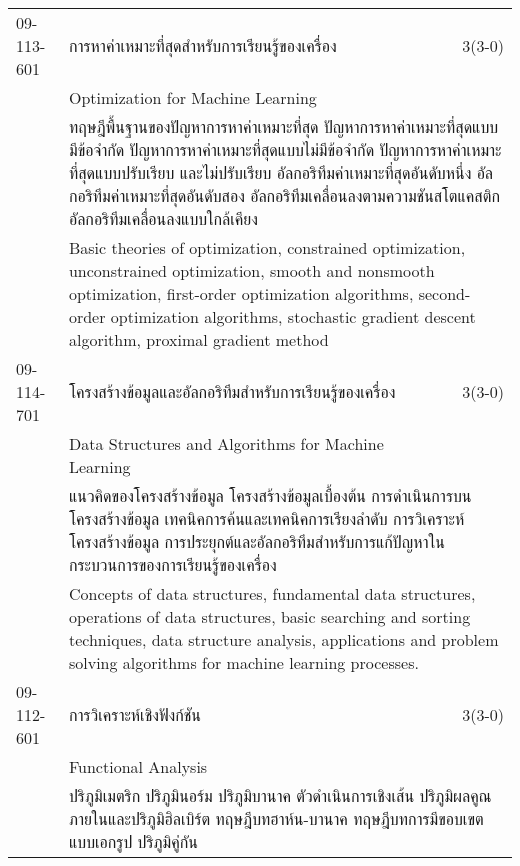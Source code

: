 \begin{longtable}{p{}p{}r{}}
09-113-601 & การหาค่าเหมาะที่สุดสำหรับการเรียนรู้ของเครื่อง & 3(3-0)\\*
 & Optimization for Machine Learning & \phantom{x} \vspace{3mm} \\*
&  \multicolumn{2}{p{0.75\textwidth}}{ทฤษฎีพื้นฐานของปัญหาการหาค่าเหมาะที่สุด ปัญหาการหาค่าเหมาะที่สุดแบบมีข้อจำกัด ปัญหาการหาค่าเหมาะที่สุดแบบไม่มีข้อจำกัด ปัญหาการหาค่าเหมาะที่สุดแบบปรับเรียบ และไม่ปรับเรียบ อัลกอริทึมค่าเหมาะที่สุดอันดับหนึ่ง อัลกอริทึมค่าเหมาะที่สุดอันดับสอง อัลกอริทึมเคลื่อนลงตามความชันสโตแคสติก อัลกอริทึมเคลื่อนลงแบบใกล้เคียง} \vspace{3mm} \\*
&  \multicolumn{2}{p{0.75\textwidth}}{Basic theories of optimization, constrained optimization, unconstrained optimization, smooth and nonsmooth optimization, first-order optimization algorithms, second-order optimization algorithms, stochastic gradient descent algorithm, proximal gradient method} \vspace{8mm} \\*
09-114-701 & โครงสร้างข้อมูลและอัลกอริทึมสำหรับการเรียนรู้ของเครื่อง & 3(3-0)\\*
 & Data Structures and Algorithms for Machine Learning & \phantom{x} \vspace{3mm} \\*
&  \multicolumn{2}{p{0.75\textwidth}}{แนวคิดของโครงสร้างข้อมูล โครงสร้างข้อมูลเบื้องต้น การดำเนินการบนโครงสร้างข้อมูล เทคนิคการค้นและเทคนิคการเรียงลำดับ การวิเคราะห์โครงสร้างข้อมูล การประยุกต์และอัลกอริทึมสำหรับการแก้ปัญหาในกระบวนการของการเรียนรู้ของเครื่อง} \vspace{3mm} \\*
&  \multicolumn{2}{p{0.75\textwidth}}{Concepts of data structures, fundamental data structures, operations of data structures, basic searching and sorting techniques, data structure analysis, applications and problem solving algorithms for machine learning processes.} \vspace{8mm} \\*
09-112-601 & การวิเคราะห์เชิงฟังก์ชัน & 3(3-0)\\*
 & Functional Analysis & \phantom{x} \vspace{3mm} \\*
&  \multicolumn{2}{p{0.75\textwidth}}{ปริภูมิเมตริก ปริภูมินอร์ม ปริภูมิบานาค ตัวดำเนินการเชิงเส้น ปริภูมิผลคูณภายในและปริภูมิฮิลเบิร์ต ทฤษฎีบทฮาห์น-บานาค ทฤษฎีบทการมีขอบเขตแบบเอกรูป ปริภูมิคู่กัน} \vspace{3mm} \\*

\end{longtable}
